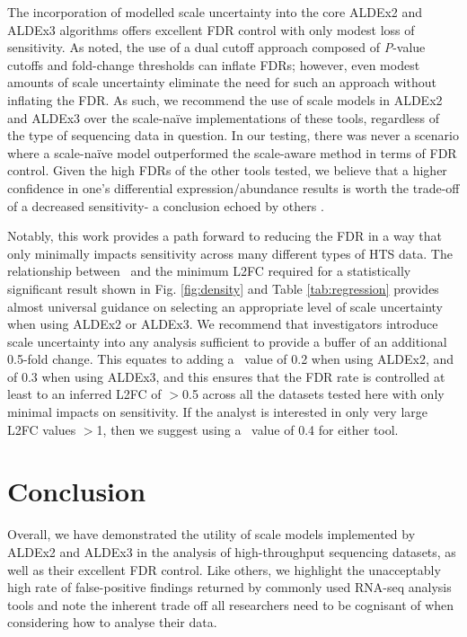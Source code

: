 \documentclass[10pt,letterpaper]{article}
\begin{document}
The incorporation of modelled scale uncertainty into the core ALDEx2 and ALDEx3 algorithms offers excellent FDR control with only modest loss of sensitivity. As noted, the use of a dual cutoff approach composed of \textit{P}-value cutoffs and fold-change thresholds can inflate FDRs; however, even modest amounts of scale uncertainty eliminate the need for such an approach without inflating the FDR. As such, we recommend the use of scale models in ALDEx2 and ALDEx3 over the scale-na\"ive implementations of these tools, regardless of the type of sequencing data in question. In our testing, there was never a scenario where a scale-na\"ive model outperformed the scale-aware method in terms of FDR control. Given the high FDRs of the other tools tested, we believe that a higher confidence in one's differential expression/abundance results is worth the trade-off of a decreased sensitivity- a conclusion echoed by others \cite{Nearing:2022aa, weiss_normalization_2017}. 

Notably, this work provides a path forward to reducing the FDR in a way that only minimally impacts sensitivity across many different types of HTS data. The relationship between \textgamma~and the minimum L2FC required for a statistically significant result shown in Fig. \ref{fig:density} and Table \ref{tab:regression} provides almost universal guidance on selecting an appropriate level of scale uncertainty when using ALDEx2 or ALDEx3. We recommend that investigators introduce scale uncertainty into any analysis sufficient to provide a buffer of an additional 0.5-fold change. This equates to adding a \textgamma~value of 0.2 when using ALDEx2, and of 0.3 when using ALDEx3, and this ensures that the FDR rate is controlled at least to an inferred L2FC of $>$0.5 across all the datasets tested here with only minimal impacts on sensitivity. If the analyst is interested in only very large L2FC values $>$1, then we suggest using a \textgamma~value of 0.4 for either tool.

\section*{Conclusion}
Overall, we have demonstrated the utility of scale models implemented by ALDEx2 and ALDEx3 in the analysis of high-throughput sequencing datasets, as well as their excellent FDR control. Like others, we highlight the unacceptably high rate of false-positive findings returned by commonly used RNA-seq analysis tools and note the inherent trade off all researchers need to be cognisant of when considering how to analyse their data.
\end{document}

